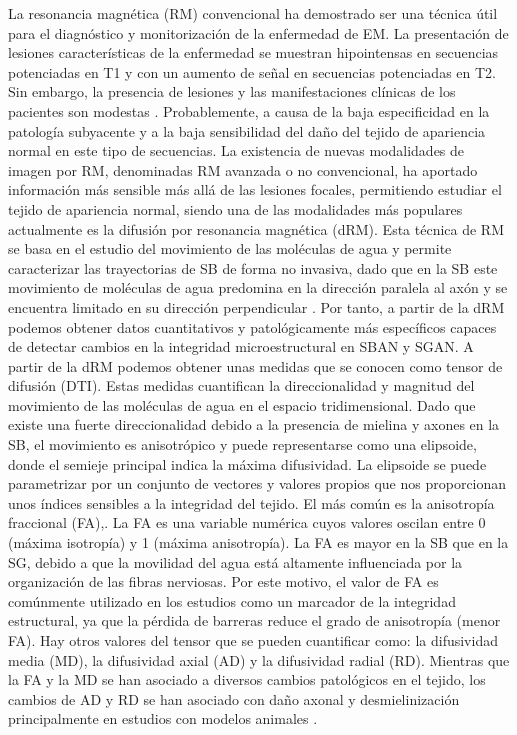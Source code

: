 La resonancia magnética (RM) convencional ha demostrado ser una  técnica útil para el diagnóstico y monitorización de la enfermedad de EM.  La presentación de lesiones características de la enfermedad se muestran hipointensas en secuencias potenciadas en T1 y con un aumento de señal en secuencias potenciadas en T2. Sin embargo, la presencia de lesiones y las manifestaciones clínicas de los pacientes son modestas \cite{Barkhof2002TheRevisited}. Probablemente, a causa de la baja especificidad en la patología subyacente y a la baja sensibilidad del daño del tejido de apariencia normal en este tipo de secuencias.  La existencia de nuevas modalidades de imagen por RM, denominadas RM avanzada o no convencional, ha aportado información más sensible más allá de las lesiones focales, permitiendo estudiar el tejido de apariencia normal, siendo una de las modalidades más populares actualmente es la difusión por resonancia magnética (dRM). Esta técnica de RM se basa en el estudio del movimiento de las moléculas de agua y permite caracterizar las trayectorias de SB de forma no invasiva, dado que en la SB este movimiento de moléculas de agua predomina en la dirección paralela al axón y se encuentra limitado en su dirección perpendicular \cite{Basser2000InDatab}.  Por tanto, a partir de la dRM podemos obtener datos cuantitativos y patológicamente más específicos capaces de detectar cambios en la integridad microestructural en SBAN y SGAN. A partir de la dRM podemos obtener unas medidas que se conocen como tensor de difusión (DTI). Estas medidas cuantifican la direccionalidad y magnitud del movimiento de las moléculas de agua en el espacio tridimensional. Dado que existe una fuerte direccionalidad debido a la presencia de mielina y axones en la SB, el movimiento es anisotrópico y puede representarse como una elipsoide, donde el semieje principal indica la máxima difusividad. La elipsoide se puede parametrizar por un conjunto de vectores y valores propios que nos proporcionan unos índices sensibles a la integridad del tejido. El más común es la anisotropía fraccional (FA),. La FA es una variable numérica cuyos valores oscilan entre 0 (máxima isotropía) y 1 (máxima anisotropía). La FA es mayor en la SB que en la SG, debido a que la movilidad del agua está altamente influenciada por la organización de las fibras nerviosas. Por este motivo, el valor de FA es comúnmente utilizado en los estudios como un marcador de la integridad estructural, ya que la pérdida de barreras reduce el grado de anisotropía (menor FA). Hay otros valores del tensor que se pueden cuantificar como: la difusividad media (MD), la difusividad axial (AD) y la difusividad radial (RD). Mientras que la FA y la MD se han asociado a diversos cambios patológicos en el tejido, los cambios de AD y RD se han asociado con daño axonal y desmielinización principalmente en estudios con modelos animales \cite{Song2005DemyelinationBrain}.

